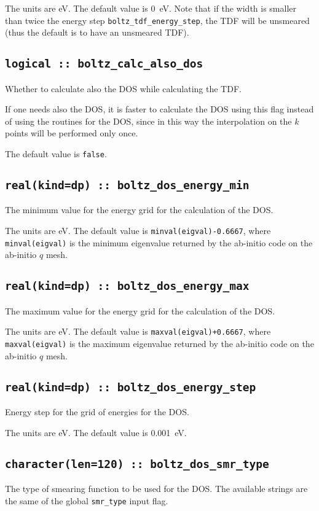 The units are eV.
The default value is 0~eV. Note that if the width is smaller than twice the energy step {\tt boltz\_tdf\_energy\_step}, the TDF will be unsmeared (thus the default is to have an unsmeared TDF).

\subsection[boltz\_calc\_also\_dos]{\tt logical :: boltz\_calc\_also\_dos}
Whether to calculate also the DOS while calculating the TDF.

If one needs also the DOS, it is faster to calculate the DOS using this flag instead of using the routines for the DOS, since in this way the interpolation on the $k$ points will be performed only once.

The default value is \verb#false#.

\subsection[boltz\_dos\_energy\_min]{\tt real(kind=dp) :: boltz\_dos\_energy\_min}
The minimum value for the energy grid for the calculation of the DOS.

The units are eV.
The default value is {\tt minval(eigval)-0.6667}, where  {\tt minval(eigval)} is the minimum eigenvalue returned by the ab-initio code on the ab-initio $q$ mesh.

\subsection[boltz\_dos\_energy\_max]{\tt real(kind=dp) :: boltz\_dos\_energy\_max}
The maximum value for the energy grid for the calculation of the DOS.

The units are eV.
The default value is {\tt maxval(eigval)+0.6667}, where  {\tt maxval(eigval)} is the maximum eigenvalue returned by the ab-initio code on the ab-initio $q$ mesh.

\subsection[boltz\_dos\_energy\_step]{\tt real(kind=dp) :: boltz\_dos\_energy\_step}
Energy step for the grid of energies for the DOS.

The units are eV.
The default value is 0.001~eV.

\subsection[boltz\_dos\_smr\_type]{\tt character(len=120) :: boltz\_dos\_smr\_type}
The type of smearing function to be used for the DOS. The available strings are the same of the global {\tt smr\_type} input flag. 

